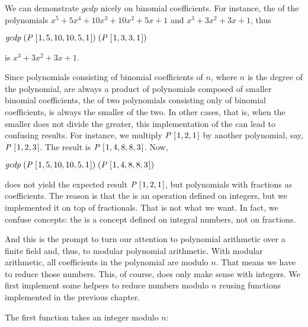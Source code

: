 \documentclass[tikz]{scrreprt}
\newcommand{\Conid}[1]{\mathit{#1}}
\newcommand{\Varid}[1]{\mathit{#1}}
\begin{document}
We can demonstrate \ensuremath{\Varid{gcdp}} nicely on binomial coefficients.
For instance, the  of the polynomials
$x^5 + 5x^4 + 10x^3 + 10x^2 + 5x + 1$ and
$x^3 + 3x^2 + 3x + 1$, thus

\ensuremath{\Varid{gcdp}\;(\Conid{P}\;[\mskip1.5mu \mathrm{1},\mathrm{5},\mathrm{10},\mathrm{10},\mathrm{5},\mathrm{1}\mskip1.5mu])\;(\Conid{P}\;[\mskip1.5mu \mathrm{1},\mathrm{3},\mathrm{3},\mathrm{1}\mskip1.5mu])}

is $x^3 + 3x^2 + 3x + 1$.

Since polynomials consisting of binomial coefficients of $n$,
where $n$ is the degree of the polynomial,
are always a product
of polynomials composed of smaller binomial coefficients,
the  of two polynomials
consisting only of binomial coefficients,
is always the smaller of the two.
In other cases, that is, when the smaller does not divide
the greater, this implementation of the 
can lead to confusing results. For instance,
we multiply \ensuremath{\Conid{P}\;[\mskip1.5mu \mathrm{1},\mathrm{2},\mathrm{1}\mskip1.5mu]} by another polynomial, say,
\ensuremath{\Conid{P}\;[\mskip1.5mu \mathrm{1},\mathrm{2},\mathrm{3}\mskip1.5mu]}. The result is \ensuremath{\Conid{P}\;[\mskip1.5mu \mathrm{1},\mathrm{4},\mathrm{8},\mathrm{8},\mathrm{3}\mskip1.5mu]}. Now,

\ensuremath{\Varid{gcdp}\;(\Conid{P}\;[\mskip1.5mu \mathrm{1},\mathrm{5},\mathrm{10},\mathrm{10},\mathrm{5},\mathrm{1}\mskip1.5mu])\;(\Conid{P}\;[\mskip1.5mu \mathrm{1},\mathrm{4},\mathrm{8},\mathrm{8},\mathrm{3}\mskip1.5mu])}

does not yield the expected result \ensuremath{\Conid{P}\;[\mskip1.5mu \mathrm{1},\mathrm{2},\mathrm{1}\mskip1.5mu]},
but polynomials with fractions as coefficients.
The reason is that the  is an operation
defined on integers, but we implemented it on top
of fractionals. That is not what we want.
In fact, we confuse concepts: the  is
a concept defined on integral numbers, not on fractions.

And this is the prompt to 
turn our attention to polynomial arithmetic
over a finite field and, thus, to modular polynomial arithmetic.
With modular arithmetic, all coefficients in the polynomial
are modulo $n$. That means we have to reduce those numbers.
This, of course, does only make sense with integers.
We first implement some helpers to reduce numbers modulo $n$
reusing functions implemented in the previous chapter.

The first function takes an integer modulo $n$:
\end{document}
